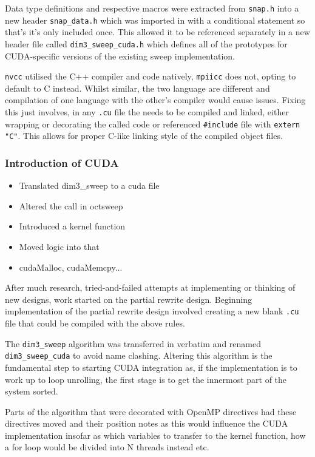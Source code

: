 \documentclass[conference]{IEEEtran}
\begin{document}
Data type definitions and respective macros were extracted from \texttt{snap.h} into a new header \texttt{snap\_data.h} which was imported in with a conditional statement so that's it's only included once. This allowed it to be referenced separately in a new header file called \texttt{dim3\_sweep\_cuda.h} which defines all of the prototypes for CUDA-specific versions of the existing sweep implementation. 

\texttt{nvcc} utilised the C++ compiler and code natively, \texttt{mpiicc} does not, opting to default to C instead. Whilst similar, the two language are different and compilation of one language with the other's compiler would cause issues. Fixing this just involves, in any \texttt{.cu} file the needs to be compiled and linked, either wrapping or decorating the called code or referenced \texttt{\#include} file with \texttt{extern "C"}. This allows for proper C-like linking style of the compiled object files.


\subsubsection{Introduction of CUDA}

\begin{itemize}
    \item Translated dim3\_sweep to a cuda file
    \item Altered the call in octsweep
    \item Introduced a kernel function
    \item Moved logic into that
    \item cudaMalloc, cudaMemcpy...
\end{itemize}

After much research, tried-and-failed attempts at implementing or thinking of new designs, work started on the partial rewrite design. Beginning implementation of the partial rewrite design involved creating a new blank \texttt{.cu} file that could be compiled with the above rules.

The \texttt{dim3\_sweep} algorithm was transferred in verbatim and renamed \texttt{dim3\_sweep\_cuda} to avoid name clashing. Altering this algorithm is the fundamental step to starting CUDA integration as, if the implementation is to work up to loop unrolling, the first stage is to get the innermost part of the system sorted.

Parts of the algorithm that were decorated with OpenMP directives had these directives moved and their position notes as this would influence the CUDA implementation insofar as which variables to transfer to the kernel function, how a for loop would be divided into N threads instead etc.
\end{document}
